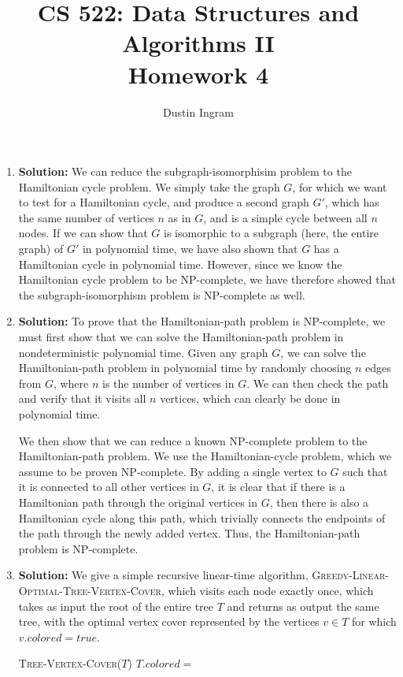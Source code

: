 \documentclass{article}
\title{CS 522: Data Structures and Algorithms II \\ Homework 4}
\author{Dustin Ingram}
\begin{document}
\maketitle
\begin{enumerate}
    \item \textbf{Solution:}
    We can reduce the subgraph-isomorphisim problem to the Hamiltonian cycle
    problem. We simply take the graph $G$, for which we want to test for a
    Hamiltonian cycle, and produce a second graph $G'$, which has the same
    number of vertices $n$ as in $G$, and is a simple cycle between all $n$
    nodes. If we can show that $G$ is isomorphic to a subgraph (here, the entire
    graph) of $G'$ in polynomial time, we have also shown that $G$ has a
    Hamiltonian cycle in polynomial time. However, since we know the Hamiltonian
    cycle problem to be NP-complete, we have therefore showed that the
    subgraph-isomorphism problem is NP-complete as well.

    \item \textbf{Solution:}
    To prove that the Hamiltonian-path problem is NP-complete, we must first
    show that we can solve the Hamiltonian-path problem in nondeterministic
    polynomial time. Given any graph $G$, we can solve the Hamiltonian-path
    problem in polynomial time by randomly choosing $n$ edges from $G$, where
    $n$ is the number of vertices in $G$. We can then check the path and verify
    that it visits all $n$ vertices, which can clearly be done in polynomial
    time.

    We then show that we can reduce a known NP-complete problem to the
    Hamiltonian-path problem. We use the Hamiltonian-cycle problem, which we
    assume to be proven NP-complete. By adding a single vertex to $G$ such that
    it is connected to all other vertices in $G$, it is clear that if there is a
    Hamiltonian path through the original vertices in $G$, then there is also a
    Hamiltonian cycle along this path, which trivially connects the endpoints of
    the path through the newly added vertex. Thus, the Hamiltonian-path problem
    is NP-complete.

    \item \textbf{Solution:}
    We give a simple recursive linear-time algorithm,
    \textsc{Greedy-Linear-Optimal-Tree-Vertex-Cover}, which visits each node
    exactly once, which takes as input the root of the entire tree $T$ and
    returns as output the same tree, with the optimal vertex cover represented
    by the vertices $v \in T$ for which $v.colored = true$.
    \begin{algorithm}[H]
        \begin{algorithmic}
            \caption{}
                \RETURN
            \ENDIF
                \STATE \textsc{Tree-Vertex-Cover($T$)}
                    \STATE $T.colored = $ \TRUE
                \ENDIF
            \ENDFOR
        \end{algorithmic}
    \end{algorithm}


\end{enumerate}
\end{document}
